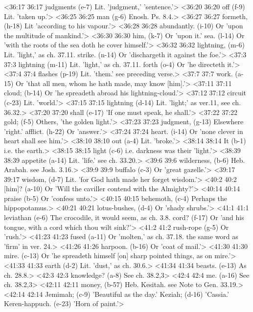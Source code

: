 <36:17 36:17  judgments (e-7)  Lit. 'judgment,' 'sentence.'>
<36:20 36:20  off (f-9)  Lit. 'taken up.'>
<36:25 36:25  man (g-6)  Enosh. Ps. 8.4.>
<36:27 36:27  formeth, (h-18)  Lit 'according to his vapour.'>
<36:28 36:28  abundantly. (i-10)  Or 'upon the multitude of mankind.'>
<36:30 36:30  him, (k-7)  Or 'upon it.'
  sea. (l-14)  Or 'with the roots of the sea doth he cover himself.'>
<36:32 36:32  lightning, (m-6) Lit. 'light,' as ch. 37.11.
  strike. (n-14)  Or 'dischargeth it against the foe.'>
<37:3 37:3  lightning (m-11)  Lit. 'light,' as ch. 37.11.
  forth (o-4)  Or 'he directeth it.'>
<37:4 37:4  flashes (p-19)  Lit. 'them.' see preceding verse.>
<37:7 37:7  work. (a-15)  Or 'that all men, whom he hath made, may know [him].'>
<37:11 37:11  cloud; (b-14)  Or 'he spreadeth abroad his lightning-cloud.'>
<37:12 37:12  circuit (c-23)  Lit. 'world.'>
<37:15 37:15  lightning (d-14)  Lit. 'light;' as ver.11, see ch. 36.32.>
<37:20 37:20  shall (e-17)  'If one must speak, he shall.'>
<37:22 37:22  gold; (f-5)  Others, 'the golden light.'>
<37:23 37:23  judgment, (g-13)  Elsewhere 'right.'
  afflict. (h-22)  Or 'answer.'>
<37:24 37:24  heart. (i-14)  Or 'none clever in heart shall see him.'>
<38:10 38:10  out (a-4)  Lit. 'broke.'>
<38:14 38:14  It (b-1)  i.e. the earth.>
<38:15 38:15  light (c-6)  i.e. darkness was their 'light.'>
<38:39 38:39  appetite (a-14)  Lit. 'life.' see ch. 33.20.>
<39:6 39:6  wilderness, (b-6)  Heb. Arabah. see Josh. 3.16.>
<39:9 39:9  buffalo (c-3)  Or 'great gazelle.'>
<39:17 39:17  wisdom, (d-7)  Lit. 'for God hath made her forget wisdom.'>
<40:2 40:2  [him]? (a-10)  Or 'Will the caviller contend with the Almighty?'>
<40:14 40:14  praise (b-5)  Or 'confess unto.'>
<40:15 40:15  behemoth, (c-4)  Perhaps the hippopotamus.>
<40:21 40:21  lotus-bushes, (d-4)  Or 'shady shrubs.'>
<41:1 41:1  leviathan (e-6)  The crocodile, it would seem, as ch. 3.8.
  cord? (f-17)  Or 'and his tongue, with a cord which thou wilt sink?'>
<41:2 41:2  rush-rope (g-5)  Or 'rush.'>
<41:23 41:23  fused (a-11)  Or 'molten,' as ch. 37.18. the same word as 'firm' in ver. 24.>
<41:26 41:26  harpoon. (b-16)  Or 'coat of mail.'>
<41:30 41:30  mire. (c-13)  Or 'he spreadeth himself [on] sharp pointed things, as on  mire.'>
<41:33 41:33  earth (d-2)  Lit. 'dust,' as ch. 30.6.>
<41:34 41:34  beasts. (e-13)  As ch. 28.8.>
<42:3 42:3  knowledge? (a-8) See ch. 38.2,3>
<42:4 42:4  me. (a-16)  See ch. 38.2,3>
<42:11 42:11  money, (b-57)  Heb. Kesitah. see Note to Gen. 33.19.>
<42:14 42:14  Jemimah; (c-9)  'Beautiful as the day.'
  Keziah; (d-16)  'Cassia.'
  Keren-happuch. (e-23)  'Horn of paint.'>
